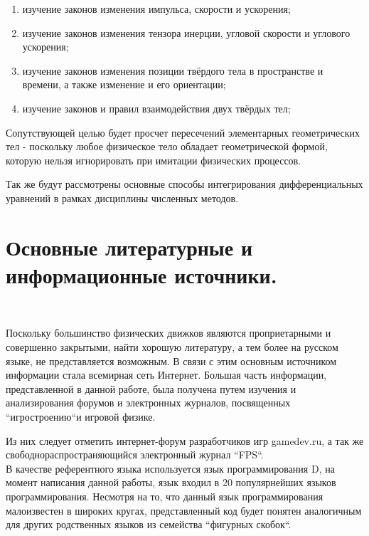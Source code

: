 \begin{enumerate}
\item изучение законов изменения импульса, скорости и ускорения; \\%
\item изучение законов изменения тензора инерции, угловой скорости
и углового ускорения; \\ 
\item изучение законов изменения позиции твёрдого тела в пространстве
и времени, а также изменение и его ориентации; \\
\item изучение законов и правил взаимодействия двух твёрдых тел; \\
\end{enumerate}

Сопутствующей целью будет просчет пересечений элементарных 
геометрических тел - поскольку любое физическое тело обладает
геометрической формой, которую нельзя игнорировать при имитации 
физических процессов.

Так же будут рассмотрены основные способы интегрирования
дифференциальных уравнений в рамках дисциплины численных методов.

\section{Основные литературные и информационные источники.}
\

Поскольку большинство физических движков являются проприетарными
и совершенно закрытыми, найти хорошую литературу, а тем более
на русском языке, не представляется возможным. В связи с этим основным
источником информации стала всемирная сеть Интернет. Большая часть 
информации, представленной в данной работе, была получена путем изучения
и анализирования форумов и электронных журналов, посвященных
``игростроению``и игровой физике.

Из них следует отметить интернет-форум разработчиков игр gamedev.ru,
а так же свободнораспространяющийся электронный журнал ``FPS``.
\\

В качестве референтного языка используется язык программирования D,
на момент написания данной работы, язык входил в 20 популярнейших языков
программирования. Несмотря на то, что данный язык программирования 
малоизвестен в широких кругах, представленный код будет понятен аналогичным 
для других родственных языков из семейства ``фигурных скобок``.


